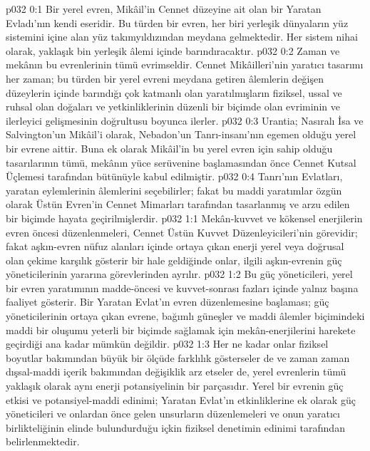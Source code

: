 \vs p032 0:1 Bir yerel evren, Mikâil’in Cennet düzeyine ait olan bir Yaratan Evladı’nın kendi eseridir. Bu türden bir evren, her biri yerleşik dünyaların yüz sistemini içine alan yüz takımyıldızından meydana gelmektedir. Her sistem nihai olarak, yaklaşık bin yerleşik âlemi içinde barındıracaktır.
\vs p032 0:2 Zaman ve mekânın bu evrenlerinin tümü evrimseldir. Cennet Mikâilleri’nin yaratıcı tasarımı her zaman; bu türden bir yerel evreni meydana getiren âlemlerin değişen düzeylerin içinde barındığı çok katmanlı olan yaratılmışların fiziksel, ussal ve ruhsal olan doğaları ve yetkinliklerinin düzenli bir biçimde olan evriminin ve ilerleyici gelişmesinin doğrultusu boyunca ilerler.
\vs p032 0:3 Urantia; Nasıralı İsa ve Salvington’un Mikâil’i olarak, Nebadon’un Tanrı\hyp{}insanı’nın egemen olduğu yerel bir evrene aittir. Buna ek olarak Mikâil’in bu yerel evren için sahip olduğu tasarılarının tümü, mekânın yüce serüvenine başlamasından önce Cennet Kutsal Üçlemesi tarafından bütünüyle kabul edilmiştir.
\vs p032 0:4 Tanrı’nın Evlatları, yaratan eylemlerinin âlemlerini seçebilirler; fakat bu maddi yaratımlar özgün olarak Üstün Evren’in Cennet Mimarları tarafından tasarlanmış ve arzu edilen bir biçimde hayata geçirilmişlerdir.
\vs p032 1:1 Mekân\hyp{}kuvvet ve kökensel enerjilerin evren öncesi düzenlenmeleri, Cennet Üstün Kuvvet Düzenleyicileri’nin görevidir; fakat aşkın\hyp{}evren nüfuz alanları içinde ortaya çıkan enerji yerel veya doğrusal olan çekime karşılık gösterir bir hale geldiğinde onlar, ilgili aşkın\hyp{}evrenin güç yöneticilerinin yararına görevlerinden ayrılır.
\vs p032 1:2 Bu güç yöneticileri, yerel bir evren yaratımının madde\hyp{}öncesi ve kuvvet\hyp{}sonrası fazları içinde yalnız başına faaliyet gösterir. Bir Yaratan Evlat’ın evren düzenlemesine başlaması; güç yöneticilerinin ortaya çıkan evrene, bağımlı güneşler ve maddi âlemler biçimindeki maddi bir oluşumu yeterli bir biçimde sağlamak için mekân\hyp{}enerjilerini harekete geçirdiği ana kadar mümkün değildir.
\vs p032 1:3 Her ne kadar onlar fiziksel boyutlar bakımından büyük bir ölçüde farklılık gösterseler de ve zaman zaman dışsal\hyp{}maddi içerik bakımından değişiklik arz etseler de, yerel evrenlerin tümü yaklaşık olarak aynı enerji potansiyelinin bir parçasıdır. Yerel bir evrenin güç etkisi ve potansiyel\hyp{}maddi edinimi; Yaratan Evlat’ın etkinliklerine ek olarak güç yöneticileri ve onlardan önce gelen unsurların düzenlemeleri ve onun yaratıcı birlikteliğinin elinde bulundurduğu içkin fiziksel denetimin edinimi tarafından belirlenmektedir.
